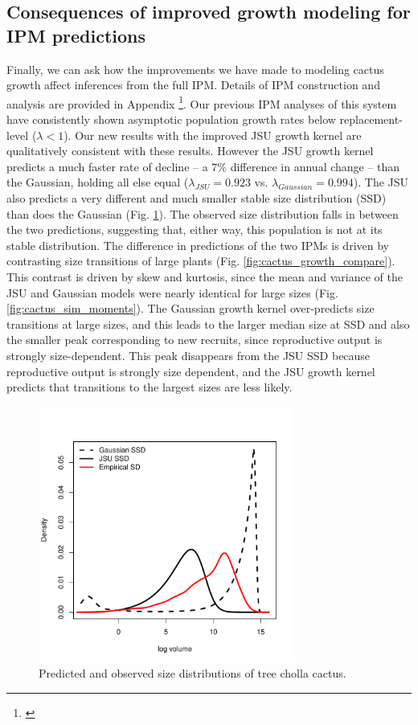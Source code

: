 \documentclass[11pt]{article}
\newcommand{\tom}[2]{{\color{red}{#1}}\footnote{\textit{\color{red}{#2}}}}
\begin{document}
{\subsection{Consequences of improved growth modeling for IPM predictions}
Finally, we can ask how the improvements we have made to modeling cactus growth affect inferences from the full IPM.
Details of IPM construction and analysis are provided in Appendix \tom{\#}{Need to do. Maybe we can have one appendix for all the IPMs.}.
Our previous IPM analyses of this system have consistently shown asymptotic population growth rates below replacement-level ($\lambda < 1$).
Our new results with the improved JSU growth kernel are qualitatively consistent with these results.
However the JSU growth kernel predicts a much faster rate of decline -- a $7\%$ difference in annual change -- than the Gaussian, holding all else equal ($\lambda_{JSU} = 0.923$ vs. $\lambda_{Gaussian} = 0.994$).
The JSU also predicts a very different and much smaller stable size distribution (SSD) than does the Gaussian (Fig. \ref{fig:cactus_ssd}). 
The observed size distribution falls in between the two predictions, suggesting that, either way, this population is not at its stable distribution. 
The difference in predictions of the two IPMs is driven by contrasting size transitions of large plants (Fig. \ref{fig:cactus_growth_compare}).
This contrast is driven by skew and kurtosis, since the mean and variance of the JSU and Gaussian models were nearly identical for large sizes (Fig. \ref{fig:cactus_sim_moments}). 
The Gaussian growth kernel over-predicts size transitions at large sizes, and this leads to the larger median size at SSD and also the smaller peak corresponding to new recruits, since reproductive output is strongly size-dependent. 
This peak disappears from the JSU SSD because reproductive output is strongly size dependent, and the JSU growth kernel predicts that transitions to the largest sizes are less likely. 
\begin{figure}
\centering
\includegraphics[width=0.75\textwidth]{figures/cactus_ssd}
\caption{Predicted and observed size distributions of tree cholla cactus.}
\label{fig:cactus_ssd}
\end{figure} 
 
}
\end{document}

